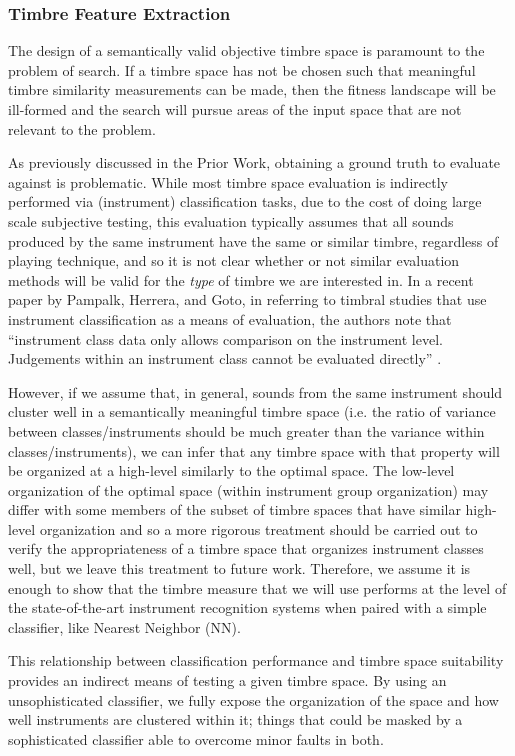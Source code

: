 \documentclass[a4paper,12pt]{report} 	%
\numberwithin{figure}{chapter}
\numberwithin{table}{chapter}
\numberwithin{equation}{chapter}
\begin{document}
\begin{flushleft}
\subsubsection{Timbre Feature Extraction}

The design of a semantically valid objective timbre space is paramount to the problem of search. If a timbre space has not be chosen such that meaningful timbre similarity measurements can be made, then the fitness landscape will be ill-formed and the search will pursue areas of the input space that are not relevant to the problem.

As previously discussed in the Prior Work, obtaining a ground truth to evaluate against is problematic. While most timbre space evaluation is indirectly performed via (instrument) classification tasks, due to the cost of doing large scale subjective testing, this evaluation typically assumes that all sounds produced by the same instrument have the same or similar timbre, regardless of playing technique, and so it is not clear whether or not similar evaluation methods will be valid for the \emph{type} of timbre we are interested in. In a recent paper by Pampalk, Herrera, and Goto, in referring to timbral studies that use instrument classification as a means of evaluation, the authors note that ``instrument class data only allows comparison on the instrument level. Judgements within an instrument class cannot be evaluated directly'' \cite[p. 9]{Pampalk:2008xz}.

However, if we assume that, in general, sounds from the same instrument should cluster well in a semantically meaningful timbre space (i.e. the ratio of variance between classes/instruments should be much greater than the variance within classes/instruments), we can infer that any timbre space with that property will be organized at a high-level similarly to the optimal space. The low-level organization of the optimal space (within instrument group organization) may differ with some members of the subset of timbre spaces that have similar high-level organization and so a more rigorous treatment should be carried out to verify the appropriateness of a timbre space that organizes instrument classes well, but we leave this treatment to future work. Therefore, we assume it is enough to show that the timbre measure that we will use performs at the level of the state-of-the-art instrument recognition systems when paired with a simple classifier, like Nearest Neighbor (NN).

This relationship between classification performance and timbre space suitability provides an indirect means of testing a given timbre space. By using an unsophisticated classifier, we fully expose the organization of the space and how well instruments are clustered within it; things that could be masked by a sophisticated classifier able to overcome minor faults in both.


\end{flushleft}
\end{document}
